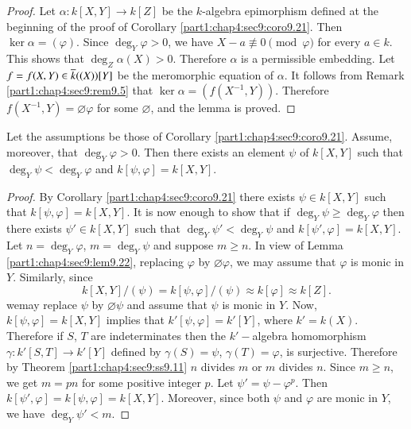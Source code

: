 \begin{proof}
  Let $\alpha: k[X, Y]\to k[Z]$ be the $k$-algebra epimorphism defined at the beginning of the proof of Corollary \ref{part1:chap4:sec9:coro9.21}. Then $\ker \alpha = (\varphi)$. Since $\deg_Y \varphi > 0$, we have $X- a \nequiv 0 \pmod{\varphi}$ for every $a \in k$. This shows that $\deg_Z \alpha (X) > 0$. Therefore $\alpha$ is a permissible embedding. Let $f = f(X, Y) \in \overline{k} ((X)) [Y]$ be the meromorphic equation of $\alpha$. It follows from Remark \ref{part1:chap4:sec9:rem9.5} that $\ker \alpha = (f(X^{-1}, Y))$. Therefore $f(X^{-1}, Y)= \diameter \varphi$ for some $\diameter$, and the lemma is 
proved. 
\end{proof}

\begin{coro}\label{part1:chap4:sec9:coro9.23}
  Let the assumptions be those of Corollary \ref{part1:chap4:sec9:coro9.21}. Assume, moreover, that $\deg_Y \varphi > 0$. Then there exists an element $\psi$ of $k[X, Y]$ such that $\deg_Y \psi < \deg_Y \varphi$ and $k[\psi, \varphi]= k[X, Y]$.
\end{coro}

\begin{proof}
  By Corollary \ref{part1:chap4:sec9:coro9.21} there exists $\psi \in k[X, Y]$ such that $k[\psi, \varphi]= k[X, Y]$. It is now enough to show that if $\deg_Y \psi \geq \deg_Y \varphi$ then there exists $\psi' \in k [X, Y]$ such that $\deg_Y \psi' < \deg_Y \psi$ and $k[\psi', \varphi]= k[X, Y]$. Let $n = \deg_Y \varphi$, $m= \deg_Y \psi$ and suppose $m \geq n$. In view of Lemma \ref{part1:chap4:sec9:lem9.22}, replacing $\varphi$ by $\diameter \varphi$, we may assume that $\varphi$ is monic in $Y$. Similarly, since
$$
k[X, Y]/(\psi)= k [\psi, \varphi]/(\psi)\approx k[\varphi] \approx k[Z].
$$ 
we\pageoriginale may replace $\psi$ by $\diameter \psi$ and assume
that $\psi$ is monic in $Y$. Now, $k[\psi, \varphi]=k[X, Y]$ implies
that $k' [\psi, \varphi] = k' [Y]$, where $k' = k(X)$. Therefore if
$S$, $T$ are indeterminates then the $k'-$algebra homomorphism
$\gamma: k' [S, T]\to k' [Y]$ defined by $\gamma (S)= \psi$,
$\gamma(T) = \varphi$, is surjective. Therefore by Theorem
\ref{part1:chap4:sec9:ss9.11} $n$ divides $m$ or $m$ divides
$n$. Since $m \geq n$, we get $m= pn$ for some positive integer
$p$. Let $\psi' = \psi - \varphi^p$. Then $k[\psi', \varphi]= k [\psi,
  \varphi]= k[X, Y]$. Moreover, since both $\psi$ and $\varphi$ are
monic in $Y$, we have $\deg_Y \psi' < m$.  
\end{proof}


